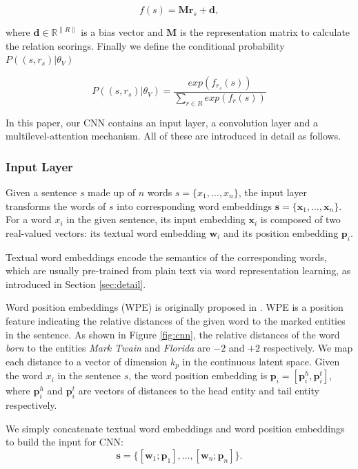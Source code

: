 \documentclass[11pt,a4paper]{article}
\begin{document}
\begin{equation}
f(s) = \mathbf{M}\mathbf{r}_{s} + \mathbf{d},
\label{eq:cnn_distance}
\end{equation}

where $\mathbf{d} \in \mathbb{R}^{\|R\|}$ is a bias vector and $\mathbf{M}$ is the representation matrix to calculate the relation scorings. Finally we define the conditional probability $P((s, r_s)|{\theta_V})$ 

\begin{equation}
P((s, r_s)|{\theta_V}) = \frac{exp(f_{r_s}(s))}{\sum_{r \in R} exp(f_{r}(s))}
\end{equation}

In this paper, our CNN contains an input layer, a convolution layer and a multilevel-attention mechanism. All of these are introduced in detail as follows.

\subsubsection{Input Layer}
Given a sentence $s$ made up of $n$ words $s = \{ x_1, \ldots , x_n\}$, the input layer transforms the words of $s$ into corresponding word embeddings $\mathbf{s} = \{ \mathbf{x}_1, \ldots , \mathbf{x}_n \}$. For a word $x_i$ in the given sentence, its input embedding $\mathbf{x}_i$ is composed of two real-valued vectors: its textual word embedding $\mathbf{w}_i$ and its position embedding $\mathbf{p}_{i}$.

Textual word embeddings encode the semantics of the corresponding words, which are usually pre-trained from plain text via word representation learning, as introduced in Section \ref{sec:detail}.

Word position embeddings (WPE) is originally proposed in \cite{zeng2014relation}. WPE is a position feature indicating the relative distances of the given word to the marked entities in the sentence. As shown in Figure \ref{fig:cnn}, the relative distances of the word \emph{born} to the entities \emph{Mark Twain} and \emph{Florida} are $-2$ and $+2$ respectively. We map each distance to a vector of dimension $k_p$ in the continuous latent space. Given the word $x_i$ in the sentence $s$, the word position embedding is $\mathbf{p}_i = [\mathbf{p}^h_i, \mathbf{p}^t_i]$, where $\mathbf{p}^h_i$ and $\mathbf{p}^t_i$ are vectors of distances to the head entity and tail entity respectively.

We simply concatenate textual word embeddings and word position embeddings to build the input for CNN:
\begin{equation}
\mathbf{s} = \{[\mathbf{w}_1;\mathbf{p}_1],\ldots, [\mathbf{w}_n;\mathbf{p}_n]\}.
\end{equation}
\end{document}
